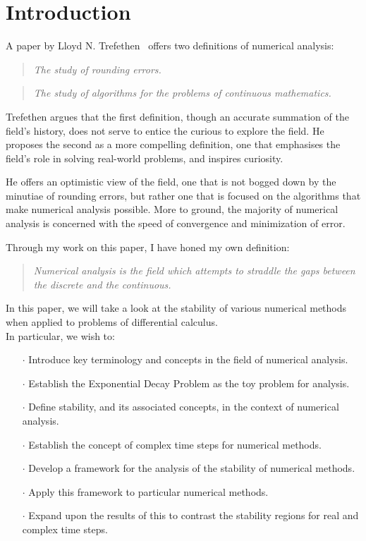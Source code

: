 \section{Introduction}
\par A paper by Lloyd N. Trefethen~\cite{trefethen_definition} offers two definitions of numerical analysis:
\begin{quote}
    \textit{The study of rounding errors.}
\end{quote}
\begin{quote}
    \textit{The study of algorithms for the problems of continuous mathematics.}
\end{quote}

\par Trefethen argues that the first definition, though an accurate summation of the field's history, does not serve to entice the curious to explore the field. He proposes the second as a more compelling definition, one that emphasises the field's role in solving real-world problems, and inspires curiosity.

\par He offers an optimistic view of the field, one that is not bogged down by the minutiae of rounding errors, but rather one that is focused on the algorithms that make numerical analysis possible. More to ground, the majority of numerical analysis is concerned with the speed of convergence and minimization of error.

Through my work on this paper, I have honed my own definition:
\begin{quote}
	\textit{Numerical analysis is the field which attempts to straddle the gaps between the discrete and the continuous.}
\end{quote}

In this paper, we will take a look at the stability of various numerical methods when applied to problems of differential calculus.\\
In particular, we wish to:
\begin{itemize}
	\item[$\cdot$] Introduce key terminology and concepts in the field of numerical analysis.
	\item[$\cdot$] Establish the Exponential Decay Problem as the toy problem for analysis.
	\item[$\cdot$] Define stability, and its associated concepts, in the context of numerical analysis.
	\item[$\cdot$] Establish the concept of complex time steps for numerical methods.
	\item[$\cdot$] Develop a framework for the analysis of the stability of numerical methods.
	\item[$\cdot$] Apply this framework to particular numerical methods.
	\item[$\cdot$] Expand upon the results of this to contrast the stability regions for real and complex time steps.
\end{itemize}
